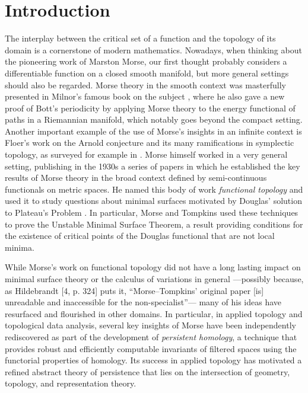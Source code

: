 
\section{Introduction}

The interplay between the critical set of a function and the topology of its domain is a cornerstone of modern mathematics.
Nowadays, when thinking about the pioneering work of Marston Morse, our first thought probably considers a differentiable function on a closed smooth manifold, but more general settings should also be regarded.
Morse theory in the smooth context was masterfully presented in Milnor's famous book on the subject \cite{MR0163331}, where he also gave a new proof of Bott's periodicity by applying Morse theory to the energy functional of paths in a Riemannian manifold, which notably goes beyond the compact setting.
Another important example of the use of Morse's insights in an infinite context is Floer's work on the Arnold conjecture and its many ramifications in symplectic topology, as surveyed for example in \cite{MR1702944}.
Morse himself worked in a very general setting, publishing in the 1930s a series of papers \cite{Morse.1937, Morse.1938, Morse.1940} in which he established the key results of Morse theory in the broad context defined by semi-continuous functionals on metric spaces.
He named this body of work \emph{functional topology} and used it to study questions about minimal surfaces motivated by Douglas' solution to Plateau’s Problem \cite{Douglas.1931}.
In particular, Morse and Tompkins \cite{Morse.1939, Morse.1941} used these techniques to prove the Unstable Minimal Surface Theorem, a result providing conditions for the existence of critical points of the Douglas functional that are not local minima.

While Morse's work on functional topology did not have a long lasting impact on minimal surface theory or the calculus of variations in general ---possibly because, as Hildebrandt [4, p. 324] puts it, ``Morse--Tompkins' original paper [is] unreadable and inaccessible for the non-specialist''---
many of his ideas have resurfaced and flourished in other domains.
In particular, in applied topology and topological data analysis, several key insights of Morse have been independently rediscovered as part of the development of \textit{persistent homology}, a technique that provides robust and efficiently computable invariants of filtered spaces using the functorial properties of homology.
Its success in applied topology has motivated a refined abstract theory of persistence that lies on the intersection of geometry, topology, and representation theory.


